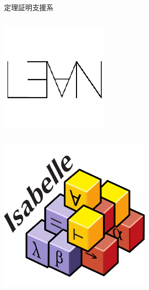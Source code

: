 \documentclass[17pt]{beamer}
\begin{document}
\begin{frame}{定理証明支援系}
\begin{columns}
\begin{column}{0.35\textwidth}
\begin{columns}
\begin{column}{0.4\textwidth}
                    \includegraphics[width=1\linewidth]{./images/lean.png}
                \end{column}
            \end{columns}
            \vspace{-10pt}
            \begin{columns}
                \begin{column}{0.4\textwidth}
                    \includegraphics[width=1\linewidth]{./images/isabelle_logo.png}

\end{column}
\end{columns}
\end{column}
\end{columns}
\end{frame}
\end{document}
